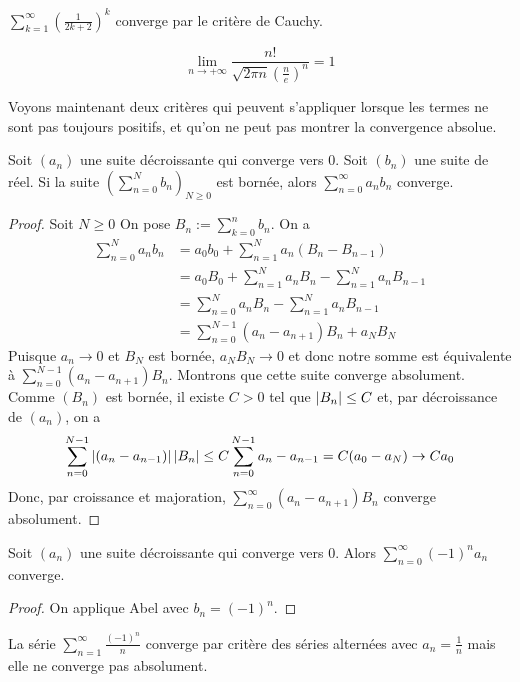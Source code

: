 \begin{exemple}
    $\sum_{k = 1}^\infty\left(\frac{1}{2k+2}\right)^k$ converge par le critère de Cauchy.
\end{exemple}
\begin{proposition}
    $$\lim_{n\to+\infty} \frac{n!}{\sqrt{2\pi n}(\frac ne)^n} = 1$$
\end{proposition}
Voyons maintenant deux critères qui peuvent s'appliquer lorsque les termes ne sont pas toujours positifs, et qu'on ne peut pas montrer la convergence absolue.
\begin{proposition}
    Soit $(a_n)$ une suite décroissante qui converge vers $0$. Soit $(b_n)$ une suite de réel. Si la suite $(\sum_{n = 0}^Nb_n)_{N\ge 0}$ est bornée, alors $\sum_{n =0}^\infty a_nb_n$ converge.
\end{proposition}
\begin{proof}
    Soit $N\ge 0$ On pose $B_n := \sum_{k = 0}^nb_n$. On a \begin{align*}
        \sum_{n=0}^Na_nb_n &= a_0b_0 + \sum_{n = 1}^Na_n(B_n-B_{n-1})\\
        &= a_0B_0 +\sum_{n = 1}^Na_nB_n - \sum_{n = 1}^Na_nB_{n-1}\\
        &= \sum_{n = 0}^Na_nB_n - \sum_{n = 1}^Na_nB_{n-1}\\
        &=\sum_{n = 0}^{N-1}(a_n- a_{n+1})B_n + a_NB_N
    \end{align*}
    Puisque $a_n\to 0$ et $B_N$ est bornée, $a_NB_N\to 0$ et donc notre somme est équivalente à $\sum_{n = 0}^{N-1}(a_n-a_{n+1})B_n$. Montrons que cette suite converge absolument. Comme $(B_n)$ est bornée, il existe $C>0$ tel que $\left| B_n \right|\le C$ et, par décroissance de $(a_n)$, on a \begin{align*}
        \sum_{n = 0}^{N-1}\left| (a_n-a_{n-1}) \right|\left| B_n \right|\le C\sum_{n = 0}^{N-1}a_n-a_{n-1} = C(a_0-a_{N})\to C a_0
    \end{align*}
    Donc, par croissance et majoration, $\sum_{n = 0}^\infty(a_n-a_{n+1})B_n$ converge absolument.
\end{proof}
\begin{corollaire}
    Soit $(a_n)$ une suite décroissante qui converge vers $0$. Alors $\sum_{n = 0}^\infty(-1)^na_n$ converge.
\end{corollaire}
\begin{proof}
    On applique Abel avec $b_n = (-1)^n$.
\end{proof}
\begin{exemple}
    La série $\sum_{n = 1}^\infty\frac{(-
    1)^n}n$ converge par critère des séries alternées avec $a_n = \frac1n$ mais elle ne converge pas absolument.
\end{exemple}
